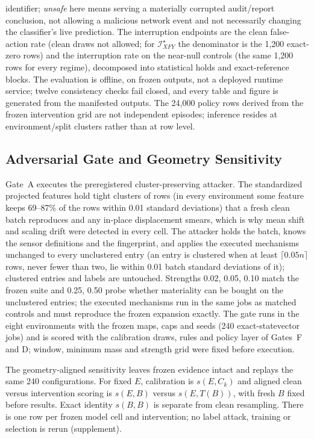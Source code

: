 \documentclass[10pt,journal,compsoc]{IEEEtran}
\newcommand{\IXFYs}{\mathcal I_{XFY}^{\star}}
\begin{document}
identifier; \emph{unsafe} here means serving a materially corrupted
audit/report conclusion, not allowing a malicious network event and not
necessarily changing the classifier's live prediction.
The interruption endpoints are the clean false-action rate (clean draws not allowed;
for $\IXFYs$ the denominator is the 1,200 exact-zero rows) and the
interruption rate on the near-null controls (the same 1,200 rows for every
regime), decomposed into statistical holds and exact-reference blocks. The
evaluation is offline, on frozen outputs, not a deployed runtime service;
twelve consistency checks fail closed, and every table and figure is
generated from the manifested outputs. The 24,000 policy rows derived from
the frozen intervention grid are not independent episodes; inference resides
at environment/split clusters rather than at row level.

\subsection{Adversarial Gate and Geometry Sensitivity}

Gate~A executes the preregistered cluster-preserving attacker. The standardized
projected features hold
tight clusters of rows (in every environment some feature keeps 69--87\% of
the rows within 0.01 standard deviations) that a fresh clean batch reproduces
and any in-place displacement smears, which is why mean shift and scaling
drift were detected in every cell. The attacker holds the batch, knows the
sensor definitions and the fingerprint, and applies the executed mechanisms
unchanged to every unclustered entry (an entry is clustered when at least
$\lceil0.05n\rceil$ rows, never fewer than two, lie within 0.01 batch
standard deviations of it); clustered entries and labels are untouched.
Strengths 0.02, 0.05, 0.10 match the frozen suite and 0.25, 0.50 probe
whether materiality can be bought on the unclustered entries; the executed
mechanisms run in the same jobs as matched controls and must reproduce the
frozen expansion exactly. The gate runs in the eight environments with the
frozen maps, caps and seeds (240 exact-statevector jobs) and is scored with
the calibration draws, rules and policy layer of Gates~F and D; window,
minimum mass and strength grid were fixed before execution.

The geometry-aligned sensitivity leaves frozen evidence intact and replays the same 240
configurations. For fixed $E$, calibration is $s(E,C_k)$ and aligned clean
versus intervention scoring is $s(E,B)$ versus $s(E,T(B))$, with fresh $B$
fixed before results. Exact identity $s(B,B)$ is separate from clean resampling.
There is one row per frozen model cell and intervention; no label attack,
training or selection is rerun (supplement).
\end{document}
